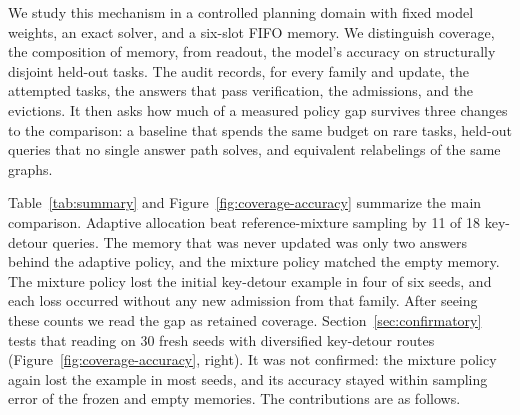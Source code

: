 \documentclass[11pt]{article}
\begin{document}
We study this mechanism in a controlled planning domain with fixed
model weights, an exact solver, and a six-slot FIFO memory. We
distinguish coverage, the composition of memory, from readout, the
model's accuracy on structurally disjoint held-out tasks. The audit
records, for every family and update, the attempted tasks, the answers
that pass verification, the admissions, and the evictions. It then
asks how much of a measured policy gap survives three changes to the
comparison: a baseline that spends the same budget on rare tasks,
held-out queries that no single answer path solves, and equivalent
relabelings of the same graphs.

Table~\ref{tab:summary} and Figure~\ref{fig:coverage-accuracy} summarize
the main comparison. Adaptive
allocation beat reference-mixture sampling by 11 of 18 key-detour
queries. The memory that was never updated was only two answers behind
the adaptive policy, and the mixture policy matched the empty memory.
The mixture policy lost the initial key-detour example in four of six
seeds, and each loss occurred without any new admission from that
family. After seeing these counts we read the gap as retained coverage.
Section~\ref{sec:confirmatory} tests that reading on 30 fresh seeds
with diversified key-detour routes (Figure~\ref{fig:coverage-accuracy},
right). It was not confirmed: the mixture
policy again lost the example in most seeds, and its accuracy stayed
within sampling error of the frozen and empty memories. The
contributions are as follows.
\end{document}
